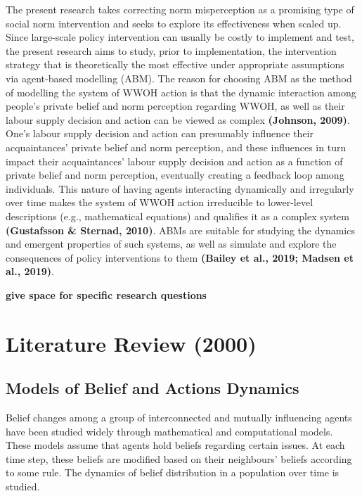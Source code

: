 \documentclass[
  11pt,
]{article}
\begin{document}
The present research takes correcting norm misperception as a promising
type of social norm intervention and seeks to explore its effectiveness
when scaled up. Since large-scale policy intervention can usually be
costly to implement and test, the present research aims to study, prior
to implementation, the intervention strategy that is theoretically the
most effective under appropriate assumptions via agent-based modelling
(ABM). The reason for choosing ABM as the method of modelling the system
of WWOH action is that the dynamic interaction among people's private
belief and norm perception regarding WWOH, as well as their labour
supply decision and action can be viewed as complex \textbf{(Johnson,
2009)}. One's labour supply decision and action can presumably influence
their acquaintances' private belief and norm perception, and these
influences in turn impact their acquaintances' labour supply decision
and action as a function of private belief and norm perception,
eventually creating a feedback loop among individuals. This nature of
having agents interacting dynamically and irregularly over time makes
the system of WWOH action irreducible to lower-level descriptions (e.g.,
mathematical equations) and qualifies it as a complex system
\textbf{(Gustafsson \& Sternad, 2010)}. ABMs are suitable for studying
the dynamics and emergent properties of such systems, as well as
simulate and explore the consequences of policy interventions to them
\textbf{(Bailey et al., 2019; Madsen et al., 2019)}.

\textbf{give space for specific research questions}

\hypertarget{literature-review-2000}{%
\section{Literature Review (2000)}\label{literature-review-2000}}

\hypertarget{models-of-belief-and-actions-dynamics}{%
\subsection{Models of Belief and Actions
Dynamics}\label{models-of-belief-and-actions-dynamics}}

Belief changes among a group of interconnected and mutually influencing
agents have been studied widely through mathematical and computational
models. These models assume that agents hold beliefs regarding certain
issues. At each time step, these beliefs are modified based on their
neighbours' beliefs according to some rule. The dynamics of belief
distribution in a population over time is studied.
\end{document}
